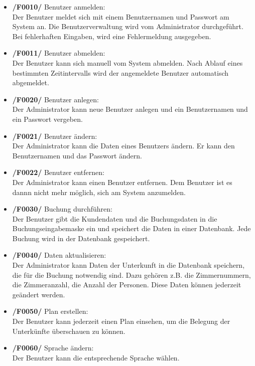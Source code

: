 \documentclass[a4paper,oneside]{scrreprt}
\begin{document}
\begin{itemize}
\item \textbf{/F0010/} Benutzer anmelden:  \\
Der Benutzer meldet sich mit einem Benutzernamen und Passwort am System an. Die Benutzerverwaltung wird vom Administrator durchgeführt. Bei fehlerhaften Eingaben, wird eine Fehlermeldung ausgegeben.

\item \textbf{/F0011/} Benutzer abmelden: \\
Der Benutzer kann sich manuell vom System abmelden. Nach Ablauf eines bestimmten Zeitintervalls wird der angemeldete Benutzer automatisch abgemeldet. 

\item \textbf{/F0020/} Benutzer anlegen:  \\
Der Administrator kann neue Benutzer anlegen und ein Benutzernamen und ein Passwort vergeben.

\item \textbf{/F0021/} Benutzer ändern: \\
Der Administrator kann die Daten eines Benutzers ändern. Er kann den Benutzernamen und das Passwort ändern.

\item \textbf{/F0022/} Benutzer entfernen: \\
Der Administrator kann einen Benutzer entfernen. Dem Benutzer ist es dannn nicht mehr möglich, sich am System anzumelden.
 
\item \textbf{/F0030/} Buchung durchführen: \\
Der Benutzer gibt die Kundendaten und die Buchungsdaten in die Buchungseingabemaske ein und speichert die Daten in einer Datenbank. Jede Buchung wird in der Datenbank gespeichert.

\item \textbf{/F0040/} Daten aktualisieren:  \\
Der Administrator kann Daten der Unterkunft in die Datenbank speichern, die für die Buchung notwendig sind. Dazu gehören z.B. die Zimmernummern, die Zimmeranzahl, die Anzahl der Personen. Diese Daten können jederzeit geändert werden.

\item \textbf{/F0050/} Plan erstellen:  \\
Der Benutzer kann jederzeit einen Plan einsehen, um die Belegung der Unterkünfte überschauen zu können.

\item \textbf{/F0060/} Sprache ändern:  \\
Der Benutzer kann die entsprechende Sprache wählen.
\end{itemize}
\end{document}
